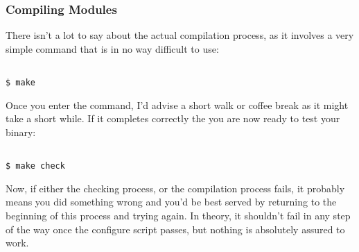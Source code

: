 \documentclass[]{article}
\begin{document}
                                                                                                                    \subsubsection{Compiling Modules}
                                                                                                                    There isn't a lot to say about the actual compilation process, as it involves a very simple command that is 
                                                                                                                    in no way difficult to use:
                                                                                                                    \begin{lstlisting}
                                                                                                                    $ make
                                                                                                                    \end{lstlisting}
                                                                                                                    Once you enter the command, I'd advise a short walk or coffee break as it might take a short while. If it 
                                                                                                                    completes correctly the you are now ready to test your binary:
                                                                                                                    \begin{lstlisting}
                                                                                                                    $ make check
                                                                                                                    \end{lstlisting}
                                                                                                                    Now, if either the checking process, or the compilation process fails, it probably means you did something 
                                                                                                                    wrong and you'd be best served by returning to the beginning of this process and trying again. In theory, it 
                                                                                                                    shouldn't fail in any step of the way once the configure script passes, but nothing is absolutely assured to 
                                                                                                                    work.
\end{document}

